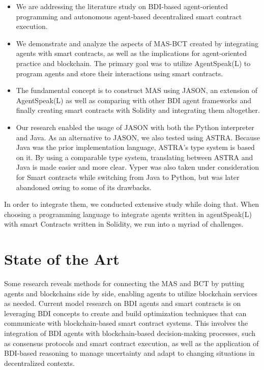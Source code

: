 \begin{itemize}
    \item We are addressing the literature study on \ac{BDI}-based agent-oriented programming and autonomous agent-based decentralized smart contract execution.

    \item We demonstrate and analyze the aspects of \ac{MAS}-\ac{BCT} created by integrating agents with smart contracts, as well as the implications for agent-oriented practice and blockchain. The primary goal was to utilize AgentSpeak(L) to program agents and store their interactions using smart contracts.
    
\vspace{.5cm}

    \item  The fundamental concept is to construct \ac{MAS} using JASON, an extension of AgentSpeak(L) as well as comparing with other \ac{BDI} agent frameworks and finally creating smart contracts with Solidity and integrating them altogether.
    
\vspace{.5cm}

    \item Our research enabled the usage of JASON with both the Python interpreter and Java. As an alternative to JASON, we also tested using ASTRA. Because Java was the prior implementation language, ASTRA's type system is based on it. By using a comparable type system, translating between ASTRA and Java is made easier and more clear. Vyper was also taken under consideration for Smart contracts while switching from Java to Python, but was later abandoned owing to some of its drawbacks.
    
\vspace{.5cm}

\end{itemize}

In order to integrate them, we conducted extensive study while doing that. When choosing a programming language to integrate agents written in agentSpeak(L) with smart Contracts written in Solidity, we run into a myriad of challenges.

\section{State of the Art}

Some research reveals methods for connecting the \ac{MAS} and \ac{BCT} by putting agents and blockchains side by side, enabling agents to utilize blockchain services as needed. Current model research on \ac{BDI} agents and smart contracts is on leveraging \ac{BDI} concepts to create and build optimization techniques that can communicate with blockchain-based smart contract systems. This involves the integration of \ac{BDI} agents with blockchain-based decision-making processes, such as consensus protocols and smart contract execution, as well as the application of \ac{BDI}-based reasoning to manage uncertainty and adapt to changing situations in decentralized contexts.

